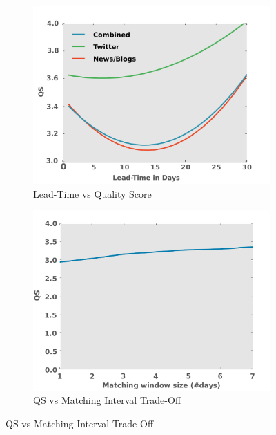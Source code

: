 \documentclass[letterpaper]{article}
\begin{document}
\begin{figure}
\begin{subfigure}{0.40\columnwidth}
    \centering
  \includegraphics[width=0.8\columnwidth]{leadTimeVsQS}
  \caption{\scriptsize Lead-Time vs Quality Score}
  \label{fig:leadTimeVsQS}
\end{subfigure}\hspace{.5pt}
\begin{subfigure}{0.40\columnwidth}
    \centering
  \includegraphics[width=0.8\columnwidth]{matchingwindow}
  \caption{\scriptsize QS vs Matching Interval Trade-Off}
  \label{fig:matchinginterval}
\end{subfigure}


\end{figure}
\end{document}

